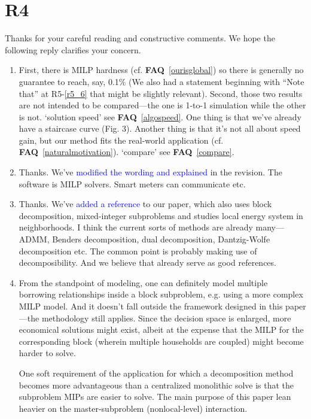 \documentclass[11pt]{article}
\newcommand{\faq}[1]{\textbf{FAQ}~\ref{#1}}
\newcommand{\blue}[1]{\textcolor{blue}{#1}}
\begin{document}
\section{R4} \label{r4ans}
Thanks for your careful reading and constructive comments. We hope the following reply clarifies your concern.
\begin{enumerate}
    \item First, there is MILP hardness (cf. \faq{ourisglobal}) so there is generally no guarantee to reach, say, 0.1\% (We
        also had a statement beginning with ``Note that'' at R5-\ref{r5_6} that might be slightly relevant).
        Second, those two results are not intended to be compared---the one is 1-to-1 simulation while the other is not.
       `solution speed' see \faq{algospeed}.
       One thing is that we've already have a staircase curve (Fig. 3).
       Another thing is that it's not all about speed gain, but our method fits the real-world application (cf. \faq{naturalmotivation}).
       `compare' see \faq{compare}.
    \item Thanks. We've \blue{modified the wording and explained} in the revision. The software is MILP solvers. Smart meters can communicate etc.
    \item \label{blockdecompocite} Thanks. We've \blue{added a reference} \cite{liu2024} to our paper, which also uses block decomposition, mixed-integer subproblems and studies local energy system in neighborhoods.
    I think the current sorts of methods are already many---ADMM, Benders decomposition, dual decomposition, Dantzig-Wolfe decomposition etc.
    The common point is probably making use of decomposibility.
    And we believe that \cite{dw2019}\cite{chenrui2024} already serve as good references.
    \item \label{multihouseblock} From the standpoint of modeling, one can definitely model multiple borrowing relationships inside a block
    subproblem, e.g. using a more complex MILP model. And it doesn't fall outside the framework designed in this
    paper---the methodology still applies. Since the decision space is enlarged, more economical solutions might
    exist, albeit at the expense that the MILP for the corresponding block (wherein multiple households are
    coupled) might become harder to solve.
    \par
    One soft requirement of the application for which a decomposition method becomes more advantageous
    than a centralized monolithic solve is that the subproblem MIPs are easier to solve.
    The main purpose of this paper lean heavier on the master-subproblem (nonlocal-level) interaction.

\end{enumerate}
\end{document}
